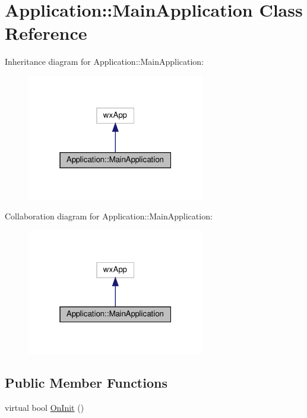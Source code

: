 \hypertarget{class_application_1_1_main_application}{}\section{Application\+:\+:Main\+Application Class Reference}
\label{class_application_1_1_main_application}


Inheritance diagram for Application\+:\+:Main\+Application\+:
\nopagebreak
\begin{figure}[H]
\begin{center}
\leavevmode
\includegraphics[width=220pt]{class_application_1_1_main_application__inherit__graph}
\end{center}
\end{figure}


Collaboration diagram for Application\+:\+:Main\+Application\+:
\nopagebreak
\begin{figure}[H]
\begin{center}
\leavevmode
\includegraphics[width=220pt]{class_application_1_1_main_application__coll__graph}
\end{center}
\end{figure}
\subsection*{Public Member Functions}
\begin{DoxyCompactItemize}
\item 
virtual bool \hyperlink{class_application_1_1_main_application_ac9714c4b1debf0d532e2b30224833b53}{On\+Init} ()
\end{DoxyCompactItemize}
